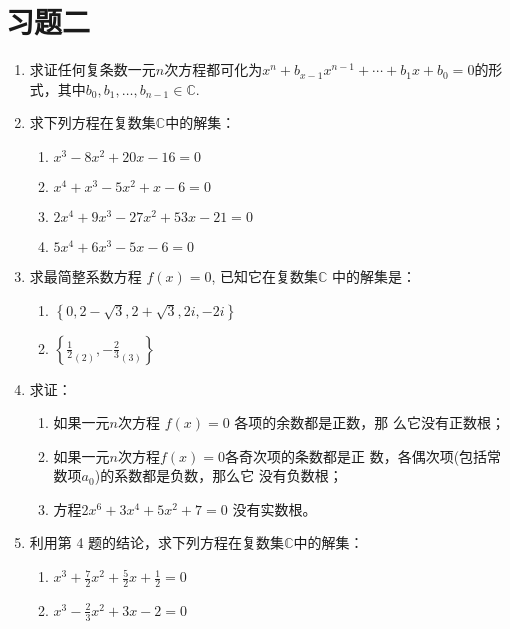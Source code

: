 \section*{习题二}
\begin{enumerate}
    \item 求证任何复条数一元$n$次方程都可化为$x^{n}+b_{x-1}x^{n-1}+\cdots+b_{1}x+b_{0}=0$的形式，其中$b_0,b_1,\ldots,b_{n-1}\in \mathbb{C}$.
    \item 求下列方程在复数集$\mathbb{C}$中的解集：
\begin{enumerate}[(1)]
    \item $x^{3}-8x^{2}+20x-16=0$ 
    \item $x^4+ x^3- 5x^2+ x- 6= 0$ 
    \item $ 2x^4+ 9x^3- 27x^2+ 53x- 21= 0$ 
    \item $5x^{4}+6x^{3}-5x-6=0$
\end{enumerate}

\item 求最简整系数方程 $f(x)=0$, 已知它在复数集$\mathbb{C}$ 中的解集是：
\begin{multicols}{2}
\begin{enumerate}[(1)]
    \item $\left\{0, 2- \sqrt {3}, 2+ \sqrt {3}, 2i, - 2i\right\}$
    \item $\left\{\frac12_{(2)},-\frac23_{(3)}\right\}$
\end{enumerate}    
\end{multicols}

\item 求证：
\begin{enumerate}[(1)]
\item 如果一元$n$次方程 $f(x)=0$ 各项的余数都是正数，那
么它没有正数根；
\item 如果一元$n$次方程$f(x)=0$各奇次项的条数都是正
数，各偶次项(包括常数项$a_0$)的系数都是负数，那么它
没有负数根；
\item 方程$2x^6+3x^4+5x^2+7=0$ 没有实数根。
\end{enumerate}

\item 利用第 4 题的结论，求下列方程在复数集$\mathbb{C}$中的解集：
\begin{multicols}{2}
\begin{enumerate}[(1)]
    \item $ x^{3}+ \frac 72x^{2}+ \frac 52x+ \frac 12= 0$ 
    \item $x^3-\frac23x^2+3x-2=0$
\end{enumerate}    
\end{multicols}


\end{enumerate}

